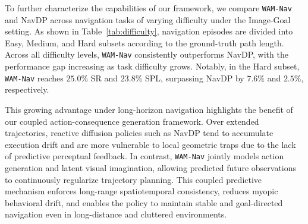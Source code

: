 \documentclass{article}
\begin{document}
To further characterize the capabilities of our framework, we compare \texttt{WAM-Nav} and NavDP across navigation tasks of varying difficulty under the Image-Goal setting. As shown in Table~\ref{tab:difficulty}, navigation episodes are divided into Easy, Medium, and Hard subsets according to the ground-truth path length. Across all difficulty levels, \texttt{WAM-Nav} consistently outperforms NavDP, with the performance gap increasing as task difficulty grows. Notably, in the Hard subset, \texttt{WAM-Nav} reaches $25.0\%$ SR and $23.8\%$ SPL, surpassing NavDP by $7.6\%$ and $2.5\%$, respectively.

This growing advantage under long-horizon navigation highlights the benefit of our coupled action-consequence generation framework. Over extended trajectories, reactive diffusion policies such as NavDP tend to accumulate execution drift and are more vulnerable to local geometric traps due to the lack of predictive perceptual feedback. In contrast, \texttt{WAM-Nav} jointly models action generation and latent visual imagination, allowing predicted future observations to continuously regularize trajectory planning. This coupled predictive mechanism enforces long-range spatiotemporal consistency, reduces myopic behavioral drift, and enables the policy to maintain stable and goal-directed navigation even in long-distance and cluttered environments.
\end{document}

